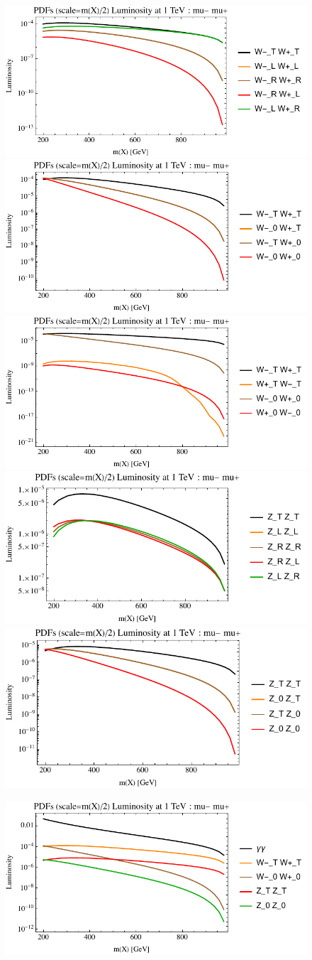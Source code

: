 \documentclass[a4paper,11pt]{article}
\begin{document}
\begin{figure}[ht]
\includegraphics[width=0.46\linewidth]{Notebooks/PlotLumi/1TeV/lumis/plotWWpolRandL.pdf}
\includegraphics[width=0.46\linewidth]{Notebooks/PlotLumi/1TeV/lumis/plotWWpolTand0.pdf}
\includegraphics[width=0.46\linewidth]{Notebooks/PlotLumi/1TeV/lumis/plotWmWpandWpWm.pdf}
\includegraphics[width=0.46\linewidth]{Notebooks/PlotLumi/1TeV/lumis/plotZZpolRandL.pdf}
\includegraphics[width=0.46\linewidth]{Notebooks/PlotLumi/1TeV/lumis/plotZZpolTand0.pdf}
\end{figure}

\begin{figure}
\includegraphics[width=0.46\linewidth]{Notebooks/PlotLumi/1TeV/lumis/plotgammaWZ.pdf}
\end{figure}
\end{document}
